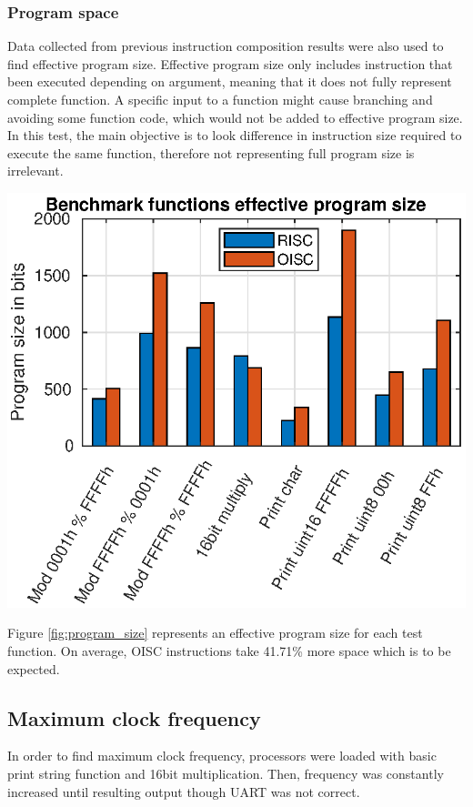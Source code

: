 \subsubsection{Program space}

Data collected from previous instruction composition results were also used to find effective program size.
Effective program size only includes instruction that been executed depending on argument, meaning that it does not fully represent complete function. A specific input to a function might cause branching and avoiding some function code, which would not be added to effective program size. In this test, the main objective is to look difference in instruction size required to execute the same function, therefore not representing full program size is irrelevant. 
\begin{colfigure}
	\centering
	\includegraphics[width=\linewidth]{../tests/program_size.eps}
	\label{fig:program_size}
\end{colfigure}

Figure \ref{fig:program_size} represents an effective program size for each test function. On average, OISC instructions take 41.71\% more space which is to be expected.

\subsection{Maximum clock frequency}
In order to find maximum clock frequency, processors were loaded with basic print string function and 16bit multiplication. Then, frequency was constantly increased until resulting output though UART was not correct. 

